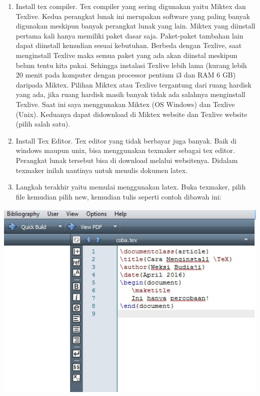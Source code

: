 \begin{enumerate}
\item Install tex compiler. Tex compiler yang sering digunakan yaitu Miktex dan Texlive. Kedua perangkat lunak ini merupakan software yang paling banyak digunakan meskipun banyak perangkat lunak yang lain. Miktex yang diinstall pertama kali hanya memiliki paket dasar saja. Paket-paket tambahan lain dapat diinstall kemudian sesuai kebutuhan. Berbeda dengan Texlive, saat menginstall Texlive maka semua paket yang 
ada akan diinstal meskipun belum tentu kita pakai. Sehingga instalasi Texlive lebih lama (kurang lebih 20 menit pada komputer dengan processor pentium i3 dan RAM 6 GB) daripada Miktex. Pilihan Miktex atau Texlive tergantung dari ruang hardisk yang ada, jika ruang hardisk masih banyak tidak ada salahnya menginstall Texlive. Saat ini saya menggunakan Miktex 
(OS Windows) dan Texlive (Unix). Keduanya dapat didownload di Miktex website dan Texlive website (pilih salah satu).
\item Install Tex Editor. Tex editor yang tidak berbayar juga banyak. Baik di windows maupun unix, bisa menggunakan texmaker sebagai tex editor. Perangkat lunak tersebut bisa di download melalui websitenya. Didalam texmaker inilah nantinya untuk menulis dokumen latex.
\item Langkah terakhir yaitu memulai menggunakan latex. Buka texmaker, pilih file kemudian pilih new, kemudian tulis seperti contoh dibawah ini:
\setcounter{numberedCntC}{\theenumi}
\end{enumerate}

\includegraphics[width=13.54cm,height=9.78cm]{gambar/image1.jpg}

